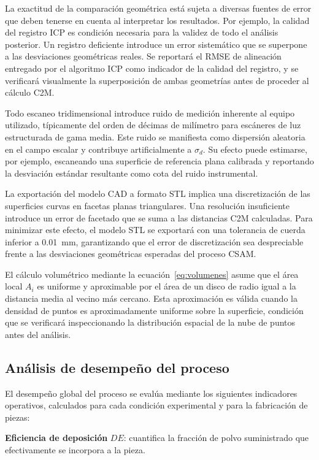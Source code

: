 La exactitud de la comparación geométrica está sujeta a diversas fuentes de error que deben
tenerse en cuenta al interpretar los resultados. Por ejemplo, la calidad del registro ICP es condición necesaria para la validez de todo el análisis
posterior. Un registro deficiente introduce un error sistemático que se superpone a las
desviaciones geométricas reales. Se reportará el RMSE de alineación entregado por el
algoritmo ICP como indicador de la calidad del registro, y se verificará visualmente la
superposición de ambas geometrías antes de proceder al cálculo C2M.

Todo escaneo tridimensional introduce ruido de medición inherente al equipo utilizado,
típicamente del orden de décimas de milímetro para escáneres de luz estructurada de gama
media. Este ruido se manifiesta como dispersión aleatoria en el campo escalar y contribuye
artificialmente a $\sigma_d$. Su efecto puede estimarse, por ejemplo, escaneando una superficie de
referencia plana calibrada y reportando la desviación estándar resultante como cota del
ruido instrumental.

La exportación del modelo CAD a formato STL implica una discretización de las superficies
curvas en facetas planas triangulares. Una resolución insuficiente introduce un error de
facetado que se suma a las distancias C2M calculadas. Para minimizar este efecto, el modelo
STL se exportará con una tolerancia de cuerda inferior a \SI{0.01}{mm}, garantizando que
el error de discretización sea despreciable frente a las desviaciones geométricas esperadas
del proceso CSAM.

El cálculo volumétrico mediante la ecuación~\eqref{eq:volumenes} asume que el área local
$A_i$ es uniforme y aproximable por el área de un disco de radio igual a la distancia media
al vecino más cercano. Esta aproximación es válida cuando la densidad de puntos es
aproximadamente uniforme sobre la superficie, condición que se verificará inspeccionando
la distribución espacial de la nube de puntos antes del análisis.




\subsection{Análisis de desempeño del proceso}

El desempeño global del proceso se evalúa mediante los siguientes indicadores operativos, calculados para cada condición experimental y para la fabricación de piezas:

\textbf{Eficiencia de deposición} $DE$: cuantifica la fracción de polvo suministrado que efectivamente se incorpora a la pieza.

